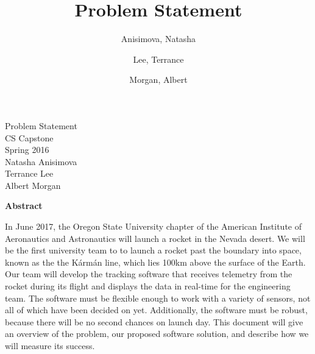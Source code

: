 \documentclass[10pt,journal,draftclsnofoot,onecolumn]{IEEEtran}
\begin{document}
\singlespace

\title{\vspace{2in}Problem Statement}

\author {
	Anisimova, Natasha
	\and
	Lee, Terrance
	\and
	Morgan, Albert
}


\pagestyle{empty}
\vspace*{2in}
\begin{center}
\huge
Problem Statement\\
\normalsize
\vspace{5mm}
CS Capstone\\
Spring 2016\\
\vspace{5mm}
Natasha Anisimova\\
Terrance Lee\\
Albert Morgan
\end{center}

\vspace{5mm}

\begin{center}
\textbf{Abstract}
\end{center}

\begin{adjustwidth}{2in}{2in}
In June 2017, the Oregon State University chapter of the
American Institute of Aeronautics and Astronautics will launch a rocket in the Nevada desert.
We will be the first university team to to launch a rocket past the boundary into space,
known as the the K\'{a}rm\'{a}n line, which lies 100km above the surface of the Earth.
Our team will develop the tracking software that receives
telemetry from the rocket during its flight
and displays the data in real-time for the engineering team.
The software must be flexible enough to work with a variety of sensors,
not all of which have been decided on yet.
Additionally, the software must be robust,
because there will be no second chances on launch day.
This document will give an overview of the problem,
our proposed software solution,
and describe how we will measure its success.
\end{adjustwidth}

\end{document}
